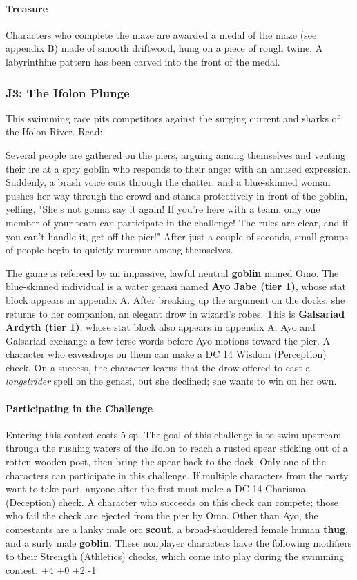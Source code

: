 \documentclass[10pt,a4,twoside,twocolumn,openany,nodeprecatedcode]{dndbook}
\begin{document}
\paragraph{Treasure}
Characters who complete the maze are awarded a medal of the maze (see appendix B) made of smooth driftwood, hung on a piece of rough twine. A labyrinthine pattern has been carved into the front of the medal.
\subsubsection{J3: The Ifolon Plunge}
This swimming race pits competitors against the surging current and sharks of the Ifolon River. Read:
\begin{DndReadAloud}{}
Several people are gathered on the piers, arguing among themselves and venting their ire at a spry goblin who responds to their anger with an amused expression. Suddenly, a brash voice cuts through the chatter, and a blue-skinned woman pushes her way through the crowd and stands protectively in front of the goblin, yelling, "She's not gonna say it again! If you're here with a team, only one member of your team can participate in the challenge! The rules are clear, and if you can't handle it, get off the pier!" After just a couple of seconds, small groups of people begin to quietly murmur among themselves.
\end{DndReadAloud}

The game is refereed by an impassive, lawful neutral \textbf{goblin} named Omo.
The blue-skinned individual is a water genasi named \textbf{Ayo Jabe (tier 1)}, whose stat block appears in appendix A. After breaking up the argument on the docks, she returns to her companion, an elegant drow in wizard's robes. This is \textbf{Galsariad Ardyth (tier 1)}, whose stat block also appears in appendix A.
Ayo and Galsariad exchange a few terse words before Ayo motions toward the pier. A character who eavesdrops on them can make a DC 14 Wisdom (Perception) check. On a success, the character learns that the drow offered to cast a \textit{longstrider} spell on the genasi, but she declined; she wants to win on her own.
\paragraph{Participating in the Challenge}
Entering this contest costs 5 sp. The goal of this challenge is to swim upstream through the rushing waters of the Ifolon to reach a rusted spear sticking out of a rotten wooden post, then bring the spear back to the dock.
Only one of the characters can participate in this challenge. If multiple characters from the party want to take part, anyone after the first must make a DC 14 Charisma (Deception) check. A character who succeeds on this check can compete; those who fail the check are ejected from the pier by Omo.
Other than Ayo, the contestants are a lanky male orc \textbf{scout}, a broad-shouldered female human \textbf{thug}, and a surly male \textbf{goblin}. These nonplayer characters have the following modifiers to their Strength (Athletics) checks, which come into play during the swimming contest:
{{+4}}
{{+0}}
{{+2}}
{{-1}}
\end{document}
